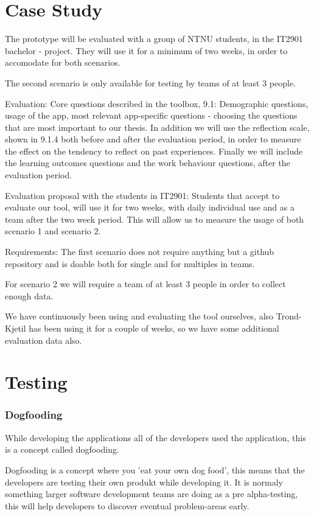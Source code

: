 \section{Case Study}
The prototype will be evaluated with a group of NTNU students, in the IT2901 bachelor - project. They will use it for a minimum of two weeks, in order to accomodate for both scenarios.

The second scenario is only available for testing by teams of at least 3 people.

Evaluation:
Core questions described in the toolbox, 9.1:
Demographic questions, usage of the app, most relevant app-specific questions - choosing the questions that are most important to our thesis. 
In addition we will use the reflection scale, shown in 9.1.4 both before and after the evaluation period, in order to measure the effect on the tendency to reflect on past
experiences. Finally we will include the learning outcomes questions and the work behaviour questions, after the evaluation period. 

Evaluation proposal with the students in IT2901: 
Students that accept to evaluate our tool, will use it for two weeks, with daily individual use and as a team after the two week period. This will allow us to measure the
usage of both scenario 1 and scenario 2.

Requirements:
The first scenario does not require anything but a github repository and is doable both for single and for multiples in teams.

For scenario 2 we will require a team of at least 3 people in order to collect enough data. 

We have continuously been using and evaluating the tool ourselves, also Trond-Kjetil has been using it for a couple of weeks, so we have some additional evaluation
data also. 


\section{Testing}
\subsubsection{Dogfooding}
While developing the applications all of the developers used the application, this is a concept called dogfooding.

Dogfooding is a concept where you 'eat your own dog food', this means that the developers are testing their own produkt while developing it. It is normaly something larger software development teams are doing as a pre alpha-testing, this will help developers to discover eventual problem-areas early.

